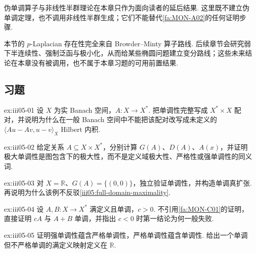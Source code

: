 \begin{FARemark}[D 级延后结果]
伪单调算子与非线性半群理论在本章只作为面向读者的延后结果. 这里既不建立伪单调定理，也不调用非线性半群生成；它们不能替代\autoref{fa:MON-A02}的任何证明步骤.
\end{FARemark}

\begin{FARemark}[与未来变分路线的边界]
本节的 \(\displaystyle p\)-Laplacian 存在性完全来自 Browder--Minty 算子路线. 后续章节会研究弱下半连续性、强制泛函与极小化，从而给某些椭圆问题建立变分路线；这些未来结论在本章没有被调用，也不属于本章习题的可用前置结果.
\end{FARemark}

\subsection{习题}

\begin{FAExercise}[对偶配对单调性]{ex:iii05-01}
设 \(\displaystyle X\) 为实 Banach 空间，\(\displaystyle A:X\to X^*\). 把单调性完整写成 \(\displaystyle X^*\times X\) 配对，并说明为什么在一般 Banach 空间中不能把该配对改写成未定义的 \(\displaystyle\langle Au-Av,u-v\rangle_X\) Hilbert 内积.
\end{FAExercise}

\begin{FAExercise}[图、定义域与极大性]{ex:iii05-02}
给定关系 \(\displaystyle A\subseteq X\times X^*\)，分别计算 \(\displaystyle G(A)\)、\(\displaystyle D(A)\)、\(\displaystyle A(x)\)，并证明极大单调性是图包含下的极大性，而不是定义域极大性、严格性或强单调性的同义词.
\end{FAExercise}

\begin{FAExercise}[单调但非极大单调反例]{ex:iii05-03}
对 \(\displaystyle X=\mathbb R\)、\(\displaystyle G(A)=\{(0,0)\}\)，独立验证单调性，并构造单调真扩张. 再说明为什么该例不反驳\autoref{iii05:full-domain-maximality}.
\end{FAExercise}

\begin{FAExercise}[正倍数缩放与求和]{ex:iii05-04}
设 \(\displaystyle A,B:X\to X^*\) 满定义且单调，\(\displaystyle c>0\). 不引用\autoref{fa:MON-C01}的证明，直接证明 \(\displaystyle cA\) 与 \(\displaystyle A+B\) 单调，并指出 \(\displaystyle c<0\) 时第一结论为何一般失败.
\end{FAExercise}

\begin{FAExercise}[强单调性]{ex:iii05-05}
证明强单调性蕴含严格单调性，严格单调性蕴含单调性. 给出一个单调但不严格单调的满定义映射定义在 \(\displaystyle\mathbb R\).
\end{FAExercise}


